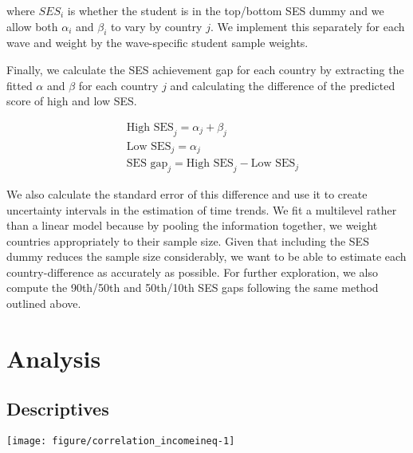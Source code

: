 \documentclass[11pt, a4paper]{article}\usepackage[]{graphicx}\usepackage[]{color}
\begin{document}
where \(SES_i\) is whether the student is in the top/bottom SES dummy and we allow both \(\alpha_i\) and \(\beta_i\) to vary by country \(j\). We implement this separately for each wave and weight by the wave-specific student sample weights.

Finally, we calculate the SES achievement gap for each country by extracting the fitted \(\alpha\) and \(\beta\) for each country \(j\) and calculating the difference of the predicted score of high and low SES.

\begin{equation}
\begin{split}
\quad \text{High SES}_j = \alpha_j + \beta_j \\
\quad \text{Low SES}_j = \alpha_j \\
\quad \text{SES gap}_j = \text{High SES}_j - \text{Low SES}_j
\end{split}
\end{equation}

We also calculate the standard error of this difference and use it to create uncertainty intervals in the estimation of time trends. We fit a multilevel rather than a linear model because by pooling the information together, we weight countries appropriately to their sample size. Given that including the SES dummy reduces the sample size considerably, we want to be able to estimate each country-difference as accurately as possible. For further exploration, we also compute the 90th/50th and 50th/10th SES gaps following the same method outlined above.

\section{Analysis}

\subsection{Descriptives}










{\centering \texttt{[image: figure/correlation\_incomeineq-1]} 

}
\end{document}
